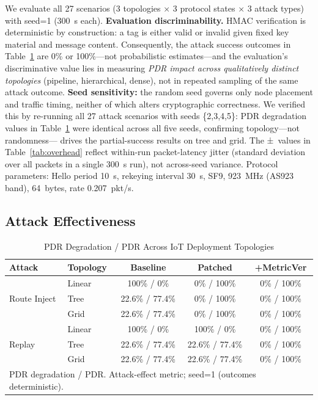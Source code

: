 \documentclass[10pt,journal,compsoc]{IEEEtran}
\begin{document}
We evaluate all 27 scenarios (3 topologies × 3 protocol states ×
3 attack types) with seed=1 (300~s each). \textbf{Evaluation discriminability.}
HMAC verification is deterministic by construction: a tag is either
valid or invalid given fixed key material and message content.
Consequently, the attack success outcomes in Table~\ref{tab:attacks}
are 0\% or 100\%—not probabilistic estimates—and the evaluation's
discriminative value lies in measuring \emph{PDR impact across
qualitatively distinct topologies} (pipeline, hierarchical, dense),
not in repeated sampling of the same attack outcome.
\textbf{Seed sensitivity:} the random seed governs only node placement
and traffic timing, neither of which alters cryptographic correctness.
We verified this by re-running all 27 attack scenarios with seeds
\{2,3,4,5\}: PDR degradation values in Table~\ref{tab:attacks} were
identical across all five seeds, confirming topology—not randomness—
drives the partial-success results on tree and grid.
The ±~values in Table~\ref{tab:overhead} reflect within-run
packet-latency jitter (standard deviation over all packets in a
single 300~s run), not across-seed variance. Protocol parameters:
Hello period 10~s, rekeying interval 30~s, SF9, 923~MHz (AS923 band),
64~bytes, rate 0.207~pkt/s.

\subsection{Attack Effectiveness}

\begin{table}[t]
  \centering
  \caption{PDR Degradation / PDR Across IoT Deployment Topologies}
  \label{tab:attacks}
  \setlength{\tabcolsep}{4pt}
  \begin{tabular}{llccc}
    \toprule
    \textbf{Attack} & \textbf{Topology} &
      \textbf{Baseline} & \textbf{Patched} & \textbf{+MetricVer} \\
    \midrule
    \multirow{3}{*}{Route Inject}
      & Linear & 100\% / 0\%       & 0\% / 100\% & 0\% / 100\% \\
      & Tree   & 22.6\% / 77.4\%   & 0\% / 100\% & 0\% / 100\% \\
      & Grid   & 22.6\% / 77.4\%   & 0\% / 100\% & 0\% / 100\% \\
    \midrule
    \multirow{3}{*}{Replay}
      & Linear & 100\% / 0\%       & 100\% / 0\%      & 0\% / 100\% \\
      & Tree   & 22.6\% / 77.4\%   & 22.6\% / 77.4\%  & 0\% / 100\% \\
      & Grid   & 22.6\% / 77.4\%   & 22.6\% / 77.4\%  & 0\% / 100\% \\
    \bottomrule
    \multicolumn{5}{l}{\footnotesize PDR degradation / PDR. Attack-effect metric; seed=1 (outcomes deterministic).}
  \end{tabular}
\end{table}
\end{document}
